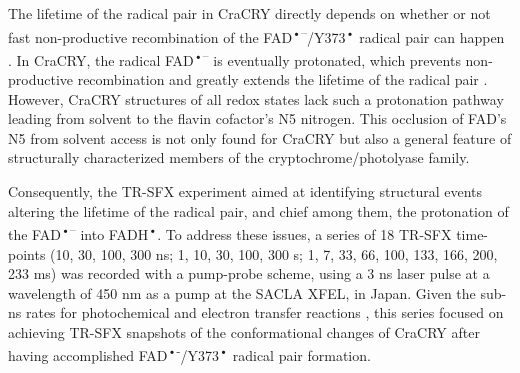 
The lifetime of the radical pair in CraCRY directly depends on whether or not fast non-productive recombination of the FAD\textsuperscript{•–}/Y373\textsuperscript{•} radical pair can happen \parencite{lacombatUltrafastOxidationTyrosine2019}. In CraCRY, the radical FAD\textsuperscript{•–} is eventually protonated, which prevents non-productive recombination and greatly extends the lifetime of the radical pair \parencite{lacombatUltrafastOxidationTyrosine2019}. However, CraCRY structures of all redox states lack such a protonation pathway leading from solvent to the flavin cofactor’s N5 nitrogen. This occlusion of FAD’s N5 from solvent access is not only found for CraCRY but also a general feature of structurally characterized members of the cryptochrome/photolyase family. 

Consequently, the TR-SFX experiment aimed at identifying structural events altering the lifetime of the radical pair, and chief among them, the protonation of the FAD\textsuperscript{•–} into FADH\textsuperscript{•}. To address these issues, a series of 18 TR-SFX time-points (10, 30, 100, 300 ns; 1, 10, 30, 100, 300 \textmu s; 1, 7, 33, 66, 100, 133, 166, 200, 233 ms) was recorded with a pump-probe scheme, using a 3 ns laser pulse at a wavelength of 450 nm as a pump at the SACLA XFEL, in Japan. Given the sub-ns rates for photochemical and electron transfer reactions \parencite{lacombatUltrafastOxidationTyrosine2019}, this series focused on achieving TR-SFX snapshots of the conformational changes of CraCRY after having accomplished FAD\textsuperscript{•-}/Y373\textsuperscript{•} radical pair formation.


